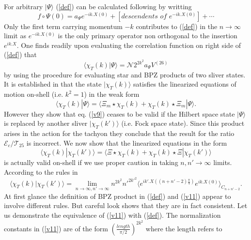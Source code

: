\documentclass[a4paper,12pt]{article}
\begin{document}
For arbitrary $|\Psi\rangle$ (\ref{def}) can be calculated following
\cite{rsz1} by writting
\begin{equation}
f\circ\Psi(0)=a_\Psi e^{-ik.X(0)}+
\left[descendents\,\, of\,\, e^{-ik.X(0)}\right] + \cdots
\label{10}
\end{equation}
 Only the first term carrying momentum $-k$ contributes to (\ref{def})
 in the $n\to\infty$ limit as $e^{-ik.X(0)}$ is the only primary operator
 non orthogonal to the insertion $e^{ik.X}$.
One finds readily upon evaluating the correlation function on right side of
(\ref{def}) that
\begin{equation}
\langle\chi_T(k)|\Psi\rangle=\mathcal{N} 2^{2k^2}a_\Psi V^{(26)}
\label{def1}
\end{equation}
by using the procedure for evaluating star and BPZ products of two sliver
states.
 It is established in \cite{rsz1} that the state $|\chi_T(k)\rangle$ satisfies
the linearized equations of motion on-shell (i.e. $k^2 =1$) in the weak form
\begin{equation}
\langle\chi_T(k)|\Psi\rangle=
\langle\Xi_m\star\chi_T(k)+\chi_T(k)\star\Xi_m|\Psi\rangle .
\label{v9}
\end{equation}
However they show that eq. (\ref{v9}) ceases
to be valid if the Hilbert space
state $|\Psi\rangle$ is replaced by another sliver
$|\chi_T(k')\rangle$ (i.e. Fock space state). Since this product arises
in the action for the tachyon they conclude that the result for the ratio
${\mathcal E}_c/{\mathcal T}_{25}$ is incorrect.
We now show that the linearized equations in the form
\begin{equation}
\langle\chi_T(k)|\chi_T(k')\rangle=
\langle\Xi\star\chi_T(k)+\chi_T(k)\star\Xi|\chi_T(k')\rangle
\label{v10}
\end{equation}
is actually valid on-shell if we use proper caution in taking
$n,n'\to\infty$ limits.
According to the rules in \cite{rsz2,rsz5}
\begin{equation}
\langle\chi_T(k)|\chi_T(k')\rangle=
\lim_{n\to\infty, n'\to\infty} n^{2k^2}{n'}^{2{k'}^2}
\langle e^{ik'.X\left(
(n+n'-2)\frac{\pi}{4}\right)} e^{ik.X(0)}\rangle_{C_{n+n'-2}} .
\label{v11}
\end{equation}
At first glance the definition of BPZ product in (\ref{def}) and
(\ref{v11}) appear to involve different rules. But careful look shows that
they are in fact consistent. Let us demonstrate the equivalence of
(\ref{v11}) with (\ref{def}). The normalization constants in (\ref{v11})
are of the form $(\frac{length}{\pi/2})^{2k^2}$ where the length refers to
\end{document}
